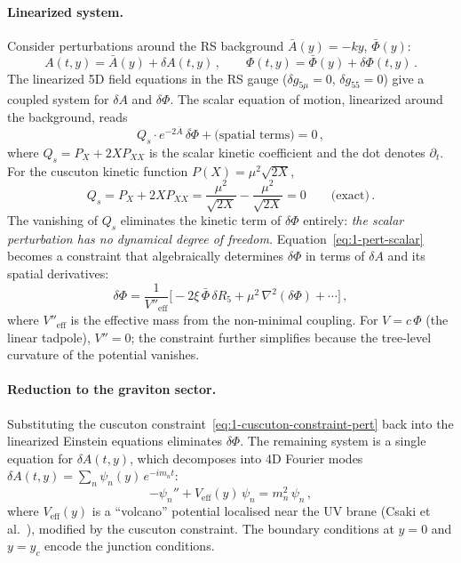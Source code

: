 \paragraph{Linearized system.} Consider perturbations around the RS background $\bar{A}(y) = -ky$, $\bar{\Phi}(y)$:
\begin{equation}
\label{eq:1-pert-ansatz}
A(t,y) = \bar{A}(y) + \delta A(t,y)\,, \qquad \Phi(t,y) = \bar{\Phi}(y) + \delta\Phi(t,y)\,.
\end{equation}
The linearized 5D field equations in the RS gauge ($\delta g_{5\mu} = 0$, $\delta g_{55} = 0$) give a coupled system for $\delta A$ and $\delta\Phi$. The scalar equation of motion, linearized around the background, reads
\begin{equation}
\label{eq:1-pert-scalar}
Q_s \cdot e^{-2\bar{A}}\,\ddot{\delta\Phi} + \text{(spatial terms)} = 0\,,
\end{equation}
where $Q_s = P_X + 2X P_{XX}$ is the scalar kinetic coefficient and the dot denotes $\partial_t$. For the cuscuton kinetic function $P(X) = \mu^2\sqrt{2X}$,
\begin{equation}
\label{eq:1-Qs-zero}
Q_s = P_X + 2X P_{XX} = \frac{\mu^2}{\sqrt{2X}} - \frac{\mu^2}{\sqrt{2X}} = 0 \qquad \text{(exact)}\,.
\end{equation}
The vanishing of $Q_s$ eliminates the kinetic term of $\delta\Phi$ entirely: \emph{the scalar perturbation has no dynamical degree of freedom.} Equation~\eqref{eq:1-pert-scalar} becomes a constraint that algebraically determines $\delta\Phi$ in terms of $\delta A$ and its spatial derivatives:
\begin{equation}
\label{eq:1-cuscuton-constraint-pert}
\delta\Phi = \frac{1}{V''_{\mathrm{eff}}}\bigl[-2\xi\,\bar{\Phi}\,\delta R_5 + \mu^2\,\nabla^2(\delta\Phi) + \cdots\bigr]\,,
\end{equation}
where $V''_{\mathrm{eff}}$ is the effective mass from the non-minimal coupling. For $V = c\,\Phi$ (the linear tadpole), $V'' = 0$; the constraint further simplifies because the tree-level curvature of the potential vanishes.

\paragraph{Reduction to the graviton sector.} Substituting the cuscuton constraint~\eqref{eq:1-cuscuton-constraint-pert} back into the linearized Einstein equations eliminates $\delta\Phi$. The remaining system is a single equation for $\delta A(t, y)$, which decomposes into 4D Fourier modes $\delta A(t, y) = \sum_n \psi_n(y)\, e^{-im_n t}$:
\begin{equation}
\label{eq:1-schrodinger-y}
-\psi_n'' + V_{\mathrm{eff}}(y)\, \psi_n = m_n^2\, \psi_n\,,
\end{equation}
where $V_{\mathrm{eff}}(y)$ is a ``volcano'' potential localised near the UV brane (Csaki et al.~\cite{ch1:csaki00}), modified by the cuscuton constraint. The boundary conditions at $y = 0$ and $y = y_c$ encode the junction conditions.

